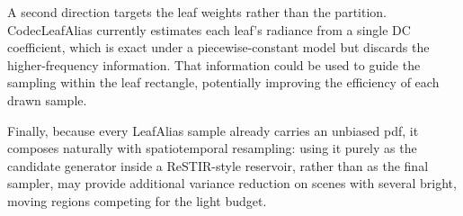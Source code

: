\documentclass[acmtog,review,anonymous]{acmart}
\begin{document}
A second direction targets the leaf weights rather than the partition. CodecLeafAlias currently estimates each leaf's radiance from a single DC coefficient, which is exact under a piecewise-constant model but discards the higher-frequency information. That information could be used to guide the sampling within the leaf rectangle, potentially improving the efficiency of each drawn sample.

Finally, because every LeafAlias sample already carries an unbiased pdf, it composes naturally with spatiotemporal resampling: using it purely as the candidate generator inside a ReSTIR-style reservoir, rather than as the final sampler, may provide additional variance reduction on scenes with several bright, moving regions competing for the light budget.



\end{document}
